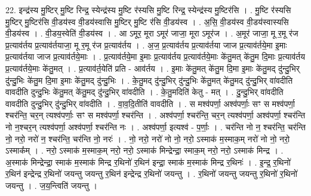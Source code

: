 \documentclass[17pt]{extarticle}
\begin{document}
22. इन्द्र॑स्य मु॒ष्टिर् मु॒ष्टि रिन्द्र॒ स्येन्द्र॑स्य मु॒ष्टि र॑स्यसि मु॒ष्टि रिन्द्र॒ स्येन्द्र॑स्य मु॒ष्टिर॑सि । . मु॒ष्टि र॑स्यसि मु॒ष्टिर् मु॒ष्टिर॑सि वी॒डय॑स्व वी॒डय॑स्वासि मु॒ष्टिर् मु॒ष्टि र॑सि वी॒डय॑स्व । . अ॒सि॒ वी॒डय॑स्व वी॒डय॑स्वास्यसि वी॒डय॑स्व । . वी॒डय॒स्वेति॑ वी॒डय॑स्व । . आ ऽमूर॒ मूरा ऽमूर॑ जाजा॒ मूरा ऽमूर॑ज । . अ॒मूर॑ जाजा॒ मू र॒मू र॑ज प्र॒त्याव॑र्तय प्र॒त्याव॑र्तयाजा॒ मू र॒मू र॑ज प्र॒त्याव॑र्तय । . अ॒ज॒ प्र॒त्याव॑र्तय प्र॒त्याव॑र्तया जाज प्र॒त्याव॑र्तये॒मा इ॒माः प्र॒त्याव॑र्तया जाज प्र॒त्याव॑र्तये॒माः । . प्र॒त्याव॑र्तये॒मा इ॒माः प्र॒त्याव॑र्तय प्र॒त्याव॑र्तये॒माः के॑तु॒मत् के॑तु॒म दि॒माः प्र॒त्याव॑र्तय प्र॒त्याव॑र्तये॒माः के॑तु॒मत् । . प्र॒त्याव॑र्त॒येति॑ प्रति - आव॑र्तय । . इ॒माः के॑तु॒मत् के॑तु॒म दि॒मा इ॒माः के॑तु॒मद् दु॑न्दु॒भिर् दु॑न्दु॒भिः के॑तु॒म दि॒मा इ॒माः के॑तु॒मद् दु॑न्दु॒भिः । . के॒तु॒मद् दु॑न्दु॒भिर् दु॑न्दु॒भिः के॑तु॒मत् के॑तु॒मद् दु॑न्दु॒भिर् वा॑वदीति वावदीति दुन्दु॒भिः के॑तु॒मत् के॑तु॒मद् दु॑न्दु॒भिर् वा॑वदीति । . के॒तु॒मदिति॑ केतु - मत् । . दु॒न्दु॒भिर् वा॑वदीति वावदीति दुन्दु॒भिर् दु॑न्दु॒भिर् वा॑वदीति । . वा॒व॒दि॒तीति॑ वावदीति । . स मश्व॑पर्णा॒ अश्व॑पर्णाः॒ सꣳ स मश्व॑पर्णा॒ श्चर॑न्ति॒ चर॒न् त्यश्व॑पर्णाः॒ सꣳ स मश्व॑पर्णा॒ श्चर॑न्ति । . अश्व॑पर्णा॒ श्चर॑न्ति॒ चर॒न् त्यश्व॑पर्णा॒ अश्व॑पर्णा॒ श्चर॑न्ति नो न॒श्चर॒न् त्यश्व॑पर्णा॒ अश्व॑पर्णा॒ श्चर॑न्ति नः । . अश्व॑पर्णा॒ इत्यश्व॑ - प॒र्णाः॒ । . चर॑न्ति नो न॒ श्चर॑न्ति॒ चर॑न्ति नो॒ नरो॒ नरो॑ न॒ श्चर॑न्ति॒ चर॑न्ति नो॒ नरः॑ । . नो॒ नरो॒ नरो॑ नो नो॒ नरो॒ ऽस्माक॑ म॒स्माक॒म् नरो॑ नो नो॒ नरो॒ ऽस्माक᳚म् । . नरो॒ ऽस्माक॑ म॒स्माक॒म् नरो॒ नरो॒ ऽस्माक॑ मिन्द्रेन्द्रा॒ स्माक॒म् नरो॒ नरो॒ ऽस्माक॑ मिन्द्र । . अ॒स्माक॑ मिन्द्रेन्द्रा॒ स्माक॑ म॒स्माक॑ मिन्द्र र॒थिनो॑ र॒थिन॑ इन्द्रा॒ स्माक॑ म॒स्माक॑ मिन्द्र र॒थिनः॑ । . इ॒न्द्र॒ र॒थिनो॑ र॒थिन॑ इन्द्रेन्द्र र॒थिनो॑ जयन्तु जयन्तु र॒थिन॑ इन्द्रेन्द्र र॒थिनो॑ जयन्तु । . र॒थिनो॑ जयन्तु जयन्तु र॒थिनो॑ र॒थिनो॑ जयन्तु । . ज॒य॒न्त्विति॑ जयन्तु । \newline
\pagebreak
{}
\end{document}
